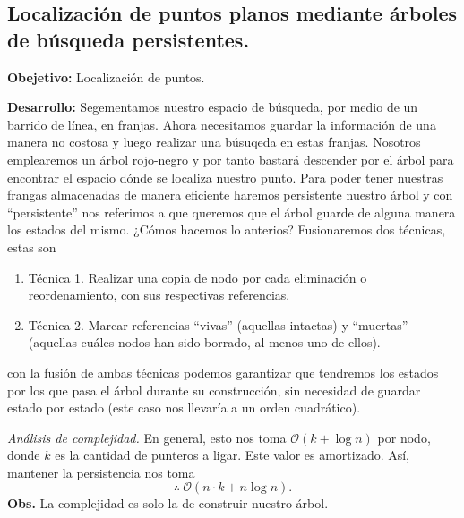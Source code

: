 \subsection[Expositor: Juan Manuel Díaz Quiñonez.]{Localización de puntos planos mediante árboles de búsqueda persistentes.}
\textbf{Obejetivo:} Localización de puntos.\newline

\textbf{Desarrollo:} Segementamos nuestro espacio de búsqueda, por medio de un barrido de línea, en franjas.
Ahora necesitamos guardar la información de una manera no costosa y luego realizar una búsuqeda en estas
franjas. Nosotros emplearemos un árbol rojo-negro y por tanto bastará descender por el árbol para encontrar
el espacio dónde se localiza nuestro punto. Para poder tener nuestras frangas almacenadas de manera eficiente
haremos persistente nuestro árbol y con ``persistente'' nos referimos a que queremos que el árbol guarde de
alguna manera los estados del mismo. ¿Cómos hacemos lo anterios? Fusionaremos dos técnicas, estas son
\begin{enumerate}
\item Técnica 1. Realizar una copia de nodo por cada eliminación o reordenamiento, con sus respectivas referencias.
\item Técnica 2. Marcar referencias ``vivas'' (aquellas intactas) y ``muertas'' (aquellas cuáles nodos han sido borrado,
  al menos uno de ellos).
\end{enumerate}
con la fusión de ambas técnicas podemos garantizar que tendremos los estados por los que pasa el árbol durante su
construcción, sin necesidad de guardar estado por estado (este caso nos llevaría a un orden cuadrático). \newline

\textit{Análisis de complejidad.} En general, esto nos toma $\mathcal{O}(k + \log n)$ por nodo,
donde $k$ es la cantidad de punteros a ligar. Este valor es amortizado. Así, mantener la persistencia
nos toma
\[\therefore\: \mathcal{O}(n\cdot k + n \log n).\]
\textbf{Obs.} La complejidad es solo la de construir nuestro árbol.
